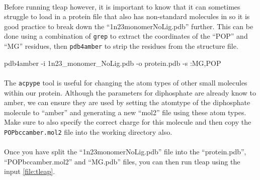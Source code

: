     \paragraph{}
        Before running tleap however, it is important to know that it can sometimes struggle to load in a protein file that also has non-standard molecules in so it is good practice to break down the \enquote{1n23\textunderscore monomer\textunderscore NoLig.pdb} further. This can be done using a combination of \texttt{grep} to extract the coordinates of the \enquote{POP} and \enquote{MG} residues, then \texttt{pdb4amber} to strip the residues from the structure file.

    \begin{bashcmd}[label=cmd:pdbamber]{}
    pdb4amber -i 1n23_monomer_NoLig.pdb -o protein.pdb -s :MG,POP
    \end{bashcmd}
      
    \paragraph{}
        The \texttt{acpype} tool is useful for changing the atom types of other small molecules within our protein. Although the parameters for diphosphate are already know to amber, we can ensure they are used by setting the atomtype of the diphosphate molecule to \enquote{amber} and generating a new \enquote{mol2} file using these atom types. Make sure to also specify the correct charge for this molecule and then copy the \texttt{POP\textunderscore bcc\textunderscore amber.mol2} file into the working directory also.

    \paragraph{}
        Once you have split the \enquote{1n23\textunderscore monomer\textunderscore NoLig.pdb} file into the \enquote{protein.pdb}, \enquote{POP\textunderscore bcc\textunderscore amber.mol2} and \enquote{MG.pdb} files, you can then run tleap using the input \cref{file:tleap}.

